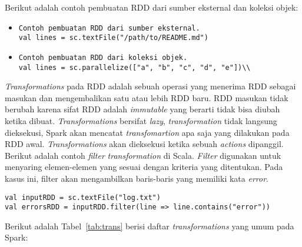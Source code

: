Berikut adalah contoh pembuatan RDD dari sumber eksternal dan koleksi objek:
\begin{itemize}

\item
\begin{verbatim}
Contoh pembuatan RDD dari sumber eksternal.
val lines = sc.textFile("/path/to/README.md")
\end{verbatim}

\item
\begin{verbatim}
Contoh pembuatan RDD dari koleksi objek.
val lines = sc.parallelize(["a", "b", "c", "d", "e"])\\
\end{verbatim}

\end{itemize}


\textit{Transformations} pada RDD adalah sebuah operasi yang menerima RDD sebagai masukan dan mengembalikan satu atau lebih RDD baru. RDD masukan tidak berubah karena sifat RDD adalah \textit{immutable} yang berarti tidak bisa diubah ketika dibuat. \textit{Transformations} bersifat \textit{lazy}, \textit{transformation} tidak langsung dieksekusi, Spark akan mencatat \textit{transfomartion} apa saja yang dilakukan pada RDD awal. \textit{Transformations} akan dieksekusi ketika sebuah \textit{actions} dipanggil.\\

Berikut adalah contoh \textit{filter} \textit{transformation} di Scala. \textit{Filter} digunakan untuk menyaring elemen-elemen yang sesuai dengan kriteria yang ditentukan. Pada kasus ini, filter akan mengambilkan baris-baris yang memiliki kata \textit{error}.
\begin{verbatim}
val inputRDD = sc.textFile("log.txt") 
val errorsRDD = inputRDD.filter(line => line.contains("error"))
\end{verbatim}

Berikut adalah Tabel~\ref{tab:trans} berisi daftar \textit{transformations} yang umum pada Spark:

